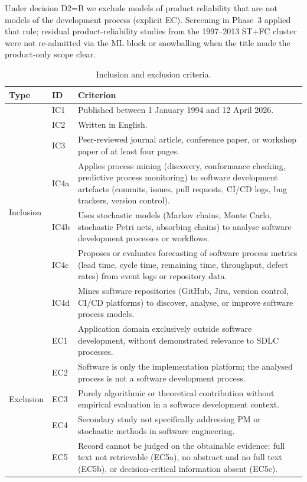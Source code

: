 \documentclass[preprint,12pt,authoryear=false]{elsarticle}
\begin{document}
Under decision D2=B we exclude models of product reliability that are not models of the development process (explicit EC). Screening in Phase~3 applied that rule; residual product-reliability studies from the 1997--2013 ST+FC cluster were not re-admitted via the ML block or snowballing when the title made the product-only scope clear.

\begin{table}[t]
\centering\small
\caption{Inclusion and exclusion criteria.}\label{tab:criteria}
\begin{tabularx}{\textwidth}{llX}
\toprule
Type & ID & Criterion \\
\midrule
\multirow{7}{*}{Inclusion}
 & IC1 & Published between 1 January 1994 and 12 April 2026. \\
 & IC2 & Written in English. \\
 & IC3 & Peer-reviewed journal article, conference paper, or workshop paper of at least four pages. \\
 & IC4a & Applies process mining (discovery, conformance checking, predictive process monitoring) to software development artefacts (commits, issues, pull requests, CI/CD logs, bug trackers, version control). \\
 & IC4b & Uses stochastic models (Markov chains, Monte Carlo, stochastic Petri nets, absorbing chains) to analyse software development processes or workflows. \\
 & IC4c & Proposes or evaluates forecasting of software process metrics (lead time, cycle time, remaining time, throughput, defect rates) from event logs or repository data. \\
 & IC4d & Mines software repositories (GitHub, Jira, version control, CI/CD platforms) to discover, analyse, or improve software process models. \\
\midrule
\multirow{5}{*}{Exclusion}
 & EC1 & Application domain exclusively outside software development, without demonstrated relevance to SDLC processes. \\
 & EC2 & Software is only the implementation platform; the analysed process is not a software development process. \\
 & EC3 & Purely algorithmic or theoretical contribution without empirical evaluation in a software development context. \\
 & EC4 & Secondary study not specifically addressing PM or stochastic methods in software engineering. \\
 & EC5 & Record cannot be judged on the obtainable evidence: full text not retrievable (EC5a), no abstract and no full text (EC5b), or decision-critical information absent (EC5c). \\
\bottomrule
\end{tabularx}
\end{table}
\end{document}
